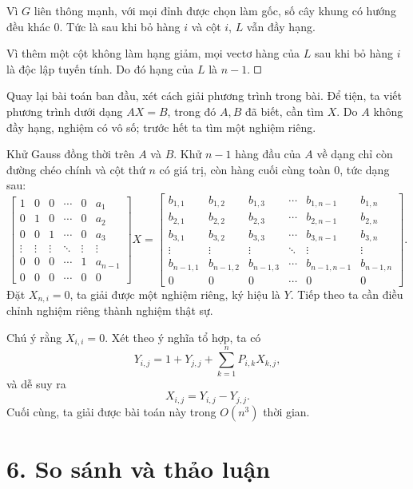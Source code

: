 \documentclass[11pt]{article}
\newcommand{\square}{\mathord{\vcenter{\hrule height .5pt
  \hbox{\vrule width .5pt height 5pt\kern5pt\vrule width .5pt}
  \hrule height .5pt}}}
\begin{document}
Vì \(G\) liên thông mạnh, với mọi đỉnh được chọn làm gốc, số cây khung có
hướng đều khác \(0\). Tức là sau khi bỏ hàng \(i\) và cột \(i\), \(L\) vẫn đầy
hạng.

Vì thêm một cột không làm hạng giảm, mọi vectơ hàng của \(L\) sau khi bỏ hàng
\(i\) là độc lập tuyến tính. Do đó hạng của \(L\) là \(n-1\). \(\square\)

Quay lại bài toán ban đầu, xét cách giải phương trình trong bài. Để tiện, ta
viết phương trình dưới dạng \(AX=B\), trong đó \(A,B\) đã biết, cần tìm \(X\).
Do \(A\) không đầy hạng, nghiệm có vô số; trước hết ta tìm một nghiệm riêng.

Khử Gauss đồng thời trên \(A\) và \(B\). Khử \(n-1\) hàng đầu của \(A\) về
dạng chỉ còn đường chéo chính và cột thứ \(n\) có giá trị, còn hàng cuối cùng
toàn \(0\), tức dạng sau:
\[
\begin{bmatrix}
1 & 0 & 0 & \cdots & 0 & a_1\\
0 & 1 & 0 & \cdots & 0 & a_2\\
0 & 0 & 1 & \cdots & 0 & a_3\\
\vdots & \vdots & \vdots & \ddots & \vdots & \vdots\\
0 & 0 & 0 & \cdots & 1 & a_{n-1}\\
0 & 0 & 0 & \cdots & 0 & 0
\end{bmatrix}X=
\begin{bmatrix}
b_{1,1} & b_{1,2} & b_{1,3} & \cdots & b_{1,n-1} & b_{1,n}\\
b_{2,1} & b_{2,2} & b_{2,3} & \cdots & b_{2,n-1} & b_{2,n}\\
b_{3,1} & b_{3,2} & b_{3,3} & \cdots & b_{3,n-1} & b_{3,n}\\
\vdots & \vdots & \vdots & \ddots & \vdots & \vdots\\
b_{n-1,1} & b_{n-1,2} & b_{n-1,3} & \cdots &
  b_{n-1,n-1} & b_{n-1,n}\\
0 & 0 & 0 & \cdots & 0 & 0
\end{bmatrix}.
\]
Đặt \(X_{n,i}=0\), ta giải được một nghiệm riêng, ký hiệu là \(Y\). Tiếp theo
ta cần điều chỉnh nghiệm riêng thành nghiệm thật sự.

Chú ý rằng \(X_{i,i}=0\). Xét theo ý nghĩa tổ hợp, ta có
\[
  Y_{i,j}=1+Y_{j,j}+\sum_{k=1}^{n}P_{i,k}X_{k,j},
\]
và dễ suy ra
\[
  X_{i,j}=Y_{i,j}-Y_{j,j}.
\]
Cuối cùng, ta giải được bài toán này trong \(O(n^3)\) thời gian.

\section*{6. So sánh và thảo luận}
\end{document}
